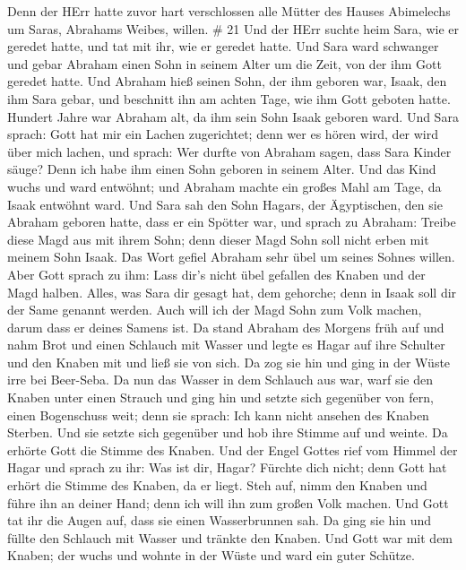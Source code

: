  Denn der HErr hatte zuvor hart verschlossen alle Mütter
des Hauses Abimelechs um Saras, Abrahams Weibes, willen. \# 21
 Und der HErr suchte heim Sara, wie er geredet hatte, und
tat mit ihr, wie er geredet hatte.  Und Sara ward schwanger
und gebar Abraham einen Sohn in seinem Alter um die Zeit, von der ihm
Gott geredet hatte.  Und Abraham hieß seinen Sohn, der ihm
geboren war, Isaak, den ihm Sara gebar,  und beschnitt ihn
am achten Tage, wie ihm Gott geboten hatte.  Hundert Jahre
war Abraham alt, da ihm sein Sohn Isaak geboren ward.  Und
Sara sprach: Gott hat mir ein Lachen zugerichtet; denn wer es hören
wird, der wird über mich lachen,  und sprach: Wer durfte von
Abraham sagen, dass Sara Kinder säuge? Denn ich habe ihm einen Sohn
geboren in seinem Alter.  Und das Kind wuchs und ward
entwöhnt; und Abraham machte ein großes Mahl am Tage, da Isaak entwöhnt
ward.  Und Sara sah den Sohn Hagars, der Ägyptischen, den
sie Abraham geboren hatte, dass er ein Spötter war,  und
sprach zu Abraham: Treibe diese Magd aus mit ihrem Sohn; denn dieser
Magd Sohn soll nicht erben mit meinem Sohn Isaak.  Das Wort
gefiel Abraham sehr übel um seines Sohnes willen.  Aber
Gott sprach zu ihm: Lass dir's nicht übel gefallen des Knaben und der
Magd halben. Alles, was Sara dir gesagt hat, dem gehorche; denn in Isaak
soll dir der Same genannt werden.  Auch will ich der Magd
Sohn zum Volk machen, darum dass er deines Samens ist.  Da
stand Abraham des Morgens früh auf und nahm Brot und einen Schlauch mit
Wasser und legte es Hagar auf ihre Schulter und den Knaben mit und ließ
sie von sich. Da zog sie hin und ging in der Wüste irre bei Beer-Seba.
 Da nun das Wasser in dem Schlauch aus war, warf sie den
Knaben unter einen Strauch  und ging hin und setzte sich
gegenüber von fern, einen Bogenschuss weit; denn sie sprach: Ich kann
nicht ansehen des Knaben Sterben. Und sie setzte sich gegenüber und hob
ihre Stimme auf und weinte.  Da erhörte Gott die Stimme des
Knaben. Und der Engel Gottes rief vom Himmel der Hagar und sprach zu
ihr: Was ist dir, Hagar? Fürchte dich nicht; denn Gott hat erhört die
Stimme des Knaben, da er liegt.  Steh auf, nimm den Knaben
und führe ihn an deiner Hand; denn ich will ihn zum großen Volk machen.
 Und Gott tat ihr die Augen auf, dass sie einen
Wasserbrunnen sah. Da ging sie hin und füllte den Schlauch mit Wasser
und tränkte den Knaben.  Und Gott war mit dem Knaben; der
wuchs und wohnte in der Wüste und ward ein guter Schütze.

